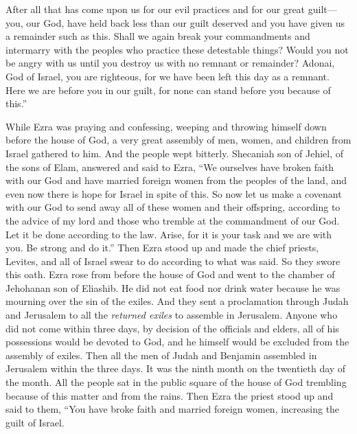 \begin{biblechapter}
\verse After all that has come upon us for our evil practices and for our great guilt—you, our God, have held back less than our guilt deserved and you have given us a remainder such as this.
\verse Shall we again break your commandments and intermarry with the peoples who practice these detestable things? Would you not be angry with us until you destroy us with no remnant or remainder?
\verse Adonai, God of Israel, you are righteous, for we have been left this day as a remnant. Here we are before you in our guilt, for none can stand before you because of this.”
\end{biblechapter}

\begin{biblechapter} %
 While Ezra was praying and confessing, weeping and throwing himself down before the house of God, a very great assembly of men, women, and children from Israel gathered to him. And the people wept bitterly.
\verse Shecaniah son of Jehiel, of the sons of Elam, answered and said to Ezra, “We ourselves have broken faith with our God and have married foreign women from the peoples of the land, and even now there is hope for Israel in spite of this.
\verse So now let us make a covenant with our God to send away all of these women and their offspring, according to the advice of my lord and those who tremble at the commandment of our God. Let it be done according to the law.
\verse Arise, for it is your task and we are with you. Be strong and do it.”
\verse Then Ezra stood up and made the chief priests, Levites, and all of Israel swear to do according to what was said. So they swore this oath.
 Ezra rose from before the house of God and went to the chamber of Jehohanan son of Eliashib. He did not eat food nor drink water because he was mourning over the sin of the exiles.
\verse And they sent a proclamation through Judah and Jerusalem to all the \textit{returned exiles} to assemble in Jerusalem.
\verse Anyone who did not come within three days, by decision of the officials and elders, all of his possessions would be devoted to God, and he himself would be excluded from the assembly of exiles.
\verse Then all the men of Judah and Benjamin assembled in Jerusalem within the three days. It was the ninth month on the twentieth day of the month. All the people sat in the public square of the house of God trembling because of this matter and from the rains.
\verse Then Ezra the priest stood up and said to them, “You have broke faith and married foreign women, increasing the guilt of Israel.

\end{biblechapter}
